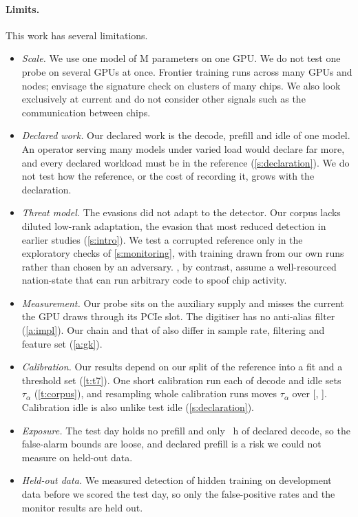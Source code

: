 \paragraph{Limits.} This work has several limitations.
\begin{itemize}
  \item \emph{Scale.} We use one model of \ModelParams{}M parameters on one GPU. We do not test one probe on several GPUs at
        once. Frontier training runs across many GPUs and nodes; \citet{scher2025} envisage the signature check on clusters of
        many chips. We also look exclusively at current and do not consider other signals such as the communication between chips.
  \item \emph{Declared work.} Our declared work is the decode, prefill and idle of one
        model. An operator serving many models under varied load would declare far
        more, and every declared workload must be in the reference
        (\cref{s:declaration}). We do not test how the reference, or the cost of
        recording it, grows with the declaration.
  \item \emph{Threat model.} The evasions did not adapt to the detector. Our corpus lacks diluted low-rank
        adaptation, the evasion that most reduced detection in earlier studies
        (\cref{s:intro}). We test a corrupted reference only in the exploratory checks
        of \cref{s:monitoring}, with training drawn from our own runs rather than
        chosen by an adversary. \citet{scher2025}, by contrast, assume a well-resourced
        nation-state that can run arbitrary code to spoof chip activity.
  \item \emph{Measurement.} Our probe sits on the auxiliary supply and misses the
        current the GPU draws through its PCIe slot. The digitiser has no anti-alias filter (\cref{a:impl}). Our chain and
        that of \citet{gargiulo2026} also differ in sample rate, filtering and feature
        set (\cref{a:gk}).
  \item \emph{Calibration.} Our results depend on our split of the reference into a
        fit and a threshold set (\cref{t:t7}). One short calibration run each of decode and idle sets $\tau_\alpha$
        (\cref{t:corpus}), and resampling whole calibration runs moves $\tau_\alpha$
        over [\TauRoneLo, \TauRoneHi]. Calibration idle is also unlike test idle
        (\cref{s:declaration}).
  \item \emph{Exposure.} The test day holds no prefill and only \ExpDecodeH~h of
        declared decode, so the false-alarm bounds are loose, and declared prefill is a
        risk we could not measure on held-out data.
  \item \emph{Held-out data.} We measured detection of hidden training on development
        data before we scored the test day, so only the false-positive rates and the
        monitor results are held out.
\end{itemize}
